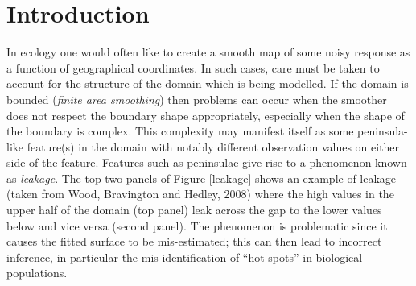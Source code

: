 \documentclass[useAMS, referee]{biom}
\begin{document}

%
\section{Introduction \label{IN}}

In ecology one would often like to create a smooth map of some noisy response as a function of geographical coordinates. In such cases, care must be taken to account for the structure of the domain which is being modelled. If the domain is bounded (\textit{finite area smoothing}) then problems can occur when the smoother does not respect the boundary shape appropriately, especially when the shape of the boundary is complex. This complexity may manifest itself as some peninsula-like feature(s) in the domain with notably different observation values on either side of the feature. Features such as peninsulae give rise to a phenomenon known as \emph{leakage}. The top two panels of Figure \ref{leakage} shows an example of leakage (taken from Wood, Bravington and Hedley, 2008) where the high values in the upper half of the domain (top panel) leak across the gap to the lower values below and vice versa (second panel). The phenomenon is problematic since it causes the fitted surface to be mis-estimated; this can then lead to incorrect inference, in particular the mis-identification of ``hot spots'' in biological populations.
\end{document}
